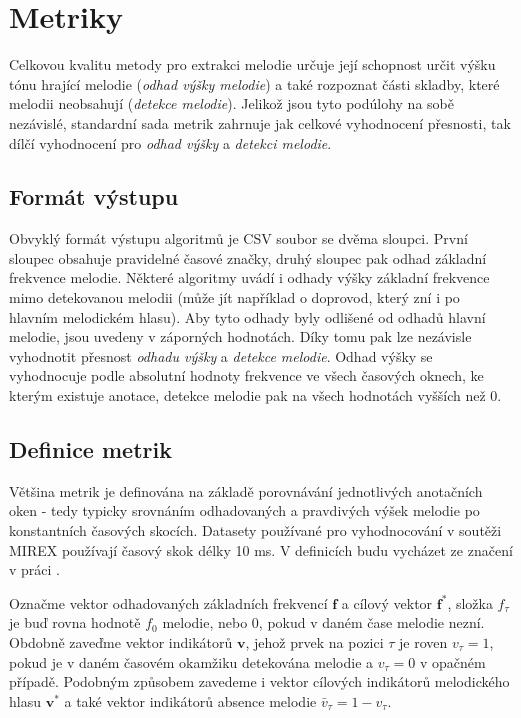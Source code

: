 \section{Metriky}

Celkovou kvalitu metody pro extrakci melodie určuje její schopnost určit výšku tónu hrající melodie (\textit{odhad výšky melodie}) a také rozpoznat části skladby, které melodii neobsahují (\textit{detekce melodie}). Jelikož jsou tyto podúlohy na sobě nezávislé, standardní sada metrik zahrnuje jak celkové vyhodnocení přesnosti, tak dílčí vyhodnocení pro \textit{odhad výšky} a \textit{detekci melodie}. 



\subsection{Formát výstupu}

Obvyklý formát výstupu algoritmů je CSV soubor se dvěma sloupci. První sloupec obsahuje pravidelné časové značky, druhý sloupec pak odhad základní frekvence melodie. Některé algoritmy uvádí i odhady výšky základní frekvence mimo detekovanou melodii (může jít například o doprovod, který zní i po hlavním melodickém hlasu). Aby tyto odhady byly odlišené od odhadů hlavní melodie, jsou uvedeny v záporných hodnotách. Díky tomu pak lze nezávisle vyhodnotit přesnost \textit{odhadu výšky} a \textit{detekce melodie}. Odhad výšky se vyhodnocuje podle absolutní hodnoty frekvence ve všech časových oknech, ke kterým existuje anotace, detekce melodie pak na všech hodnotách vyšších než 0. 

\subsection{Definice metrik}

Většina metrik je definována na základě porovnávání jednotlivých anotačních oken - tedy typicky srovnáním odhadovaných a pravdivých výšek melodie po konstantních časových skocích. Datasety používané pro vyhodnocování v soutěži MIREX používají časový skok délky 10 ms. V definicích budu vycházet ze značení v práci \cite{Salamon2014}. 

    Označme vektor odhadovaných základních frekvencí $\mathbf{f}$ a cílový vektor $\mathbf{f^*}$, složka $f_\tau$ je buď rovna hodnotě $f_0$ melodie, nebo $0$, pokud v daném čase melodie nezní. Obdobně zaveďme vektor indikátorů $\mathbf{v}$, jehož prvek na pozici $\tau$ je roven $v_\tau=1$, pokud je v daném časovém okamžiku detekována melodie a $v_\tau = 0$ v opačném případě. Podobným způsobem zavedeme i vektor cílových indikátorů melodického hlasu $\mathbf{v^*}$ a také vektor indikátorů absence melodie $\bar{v}_\tau = 1 - v_\tau$. 

